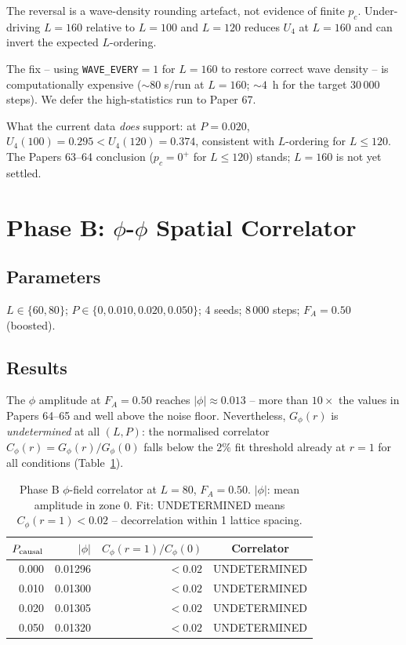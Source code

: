 \documentclass[12pt,a4paper]{article}
\begin{document}
The reversal is a wave-density rounding artefact, not evidence of finite $p_c$.
Under-driving $L=160$ relative to $L=100$ and $L=120$ reduces $U_4$ at $L=160$
and can invert the expected $L$-ordering.

The fix -- using \texttt{WAVE\_EVERY}$=1$ for $L=160$ to restore correct wave
density -- is computationally expensive ($\sim 80$ s/run at $L=160$;
$\sim 4$~h for the target 30\,000 steps).  We defer the high-statistics run
to Paper 67.

What the current data \emph{does} support: at $P=0.020$,
$U_4(100) = 0.295 < U_4(120) = 0.374$, consistent with $L$-ordering for
$L \le 120$.  The Papers 63--64 conclusion ($p_c = 0^+$ for $L \le 120$)
stands; $L=160$ is not yet settled.

\section{Phase B: $\phi$-$\phi$ Spatial Correlator}

\subsection{Parameters}

$L \in \{60, 80\}$; $P \in \{0, 0.010, 0.020, 0.050\}$;
4 seeds; 8\,000 steps; $F_A = 0.50$ (boosted).

\subsection{Results}

The $\phi$ amplitude at $F_A=0.50$ reaches $|\phi| \approx 0.013$ -- more than
$10\times$ the values in Papers 64--65 and well above the noise floor.
Nevertheless, $G_\phi(r)$ is \emph{undetermined} at all $(L, P)$:
the normalised correlator $C_\phi(r) = G_\phi(r)/G_\phi(0)$ falls below
the $2\%$ fit threshold already at $r=1$ for all conditions
(Table~\ref{tab:phaseB}).

\begin{table}[h]
\centering
\caption{Phase B $\phi$-field correlator at $L=80$, $F_A=0.50$.
$|\phi|$: mean amplitude in zone 0.  Fit: UNDETERMINED means $C_\phi(r=1) < 0.02$
-- decorrelation within 1 lattice spacing.}
\label{tab:phaseB}
\begin{tabular}{rrrc}
\toprule
$P_{\rm causal}$ & $|\phi|$ & $C_\phi(r=1)/C_\phi(0)$ & Correlator \\
\midrule
0.000 & 0.01296 & $< 0.02$ & UNDETERMINED \\
0.010 & 0.01300 & $< 0.02$ & UNDETERMINED \\
0.020 & 0.01305 & $< 0.02$ & UNDETERMINED \\
0.050 & 0.01320 & $< 0.02$ & UNDETERMINED \\
\bottomrule
\end{tabular}
\end{table}
\end{document}
